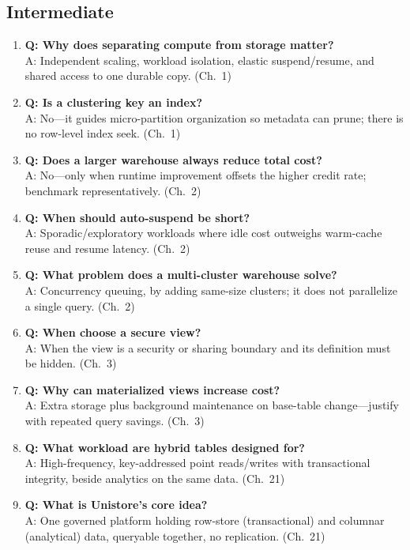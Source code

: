 \subsection{Intermediate}
\begin{enumerate}
    \item \textbf{Q: Why does separating compute from storage matter?}\\
    A: Independent scaling, workload isolation, elastic suspend/resume, and shared access to one durable copy. (Ch.~1)
    \item \textbf{Q: Is a clustering key an index?}\\
    A: No---it guides micro-partition organization so metadata can prune; there is no row-level index seek. (Ch.~1)
    \item \textbf{Q: Does a larger warehouse always reduce total cost?}\\
    A: No---only when runtime improvement offsets the higher credit rate; benchmark representatively. (Ch.~2)
    \item \textbf{Q: When should auto-suspend be short?}\\
    A: Sporadic/exploratory workloads where idle cost outweighs warm-cache reuse and resume latency. (Ch.~2)
    \item \textbf{Q: What problem does a multi-cluster warehouse solve?}\\
    A: Concurrency queuing, by adding same-size clusters; it does not parallelize a single query. (Ch.~2)
    \item \textbf{Q: When choose a secure view?}\\
    A: When the view is a security or sharing boundary and its definition must be hidden. (Ch.~3)
    \item \textbf{Q: Why can materialized views increase cost?}\\
    A: Extra storage plus background maintenance on base-table change---justify with repeated query savings. (Ch.~3)
    \item \textbf{Q: What workload are hybrid tables designed for?}\\
    A: High-frequency, key-addressed point reads/writes with transactional integrity, beside analytics on the same data. (Ch.~21)
    \item \textbf{Q: What is Unistore's core idea?}\\
    A: One governed platform holding row-store (transactional) and columnar (analytical) data, queryable together, no replication. (Ch.~21)
\end{enumerate}

